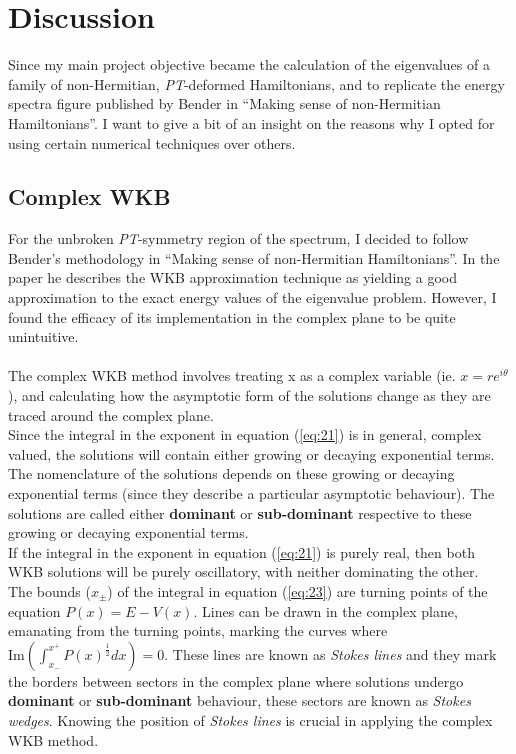 \documentclass[10pt, a4paper, singlespacing, headsepline]{report}
\newcommand\PT{\emph{PT}}
\begin{document}
\chapter{Discussion}\label{Discussion}
Since my main project objective became the calculation of the eigenvalues of a family of non-Hermitian, \PT-deformed Hamiltonians, and to replicate the energy spectra figure published by Bender in ``Making sense of non-Hermitian Hamiltonians''. I want to give a bit of an insight on the reasons why I opted for using certain numerical techniques over others.

\section{Complex WKB}\label{Complex WKB}
For the unbroken \PT-symmetry region of the spectrum, I decided to follow Bender's methodology in ``Making sense of non-Hermitian Hamiltonians''. In the paper he describes the WKB approximation technique as yielding a good approximation to the exact energy values of the eigenvalue problem. However, I found the efficacy of its implementation in the complex plane to be quite unintuitive.\\\\
The complex WKB method involves treating x as a complex variable (ie. $x = re^{i\theta}$), and calculating how the asymptotic form of the solutions change as they are traced around the complex plane\cite{Sorrell}.\\
Since the integral in the exponent in equation (\ref{eq:21}) is in general, complex valued, the solutions will contain either growing or decaying exponential terms. The nomenclature of the solutions depends on these growing or decaying exponential terms (since they describe a particular asymptotic behaviour). The solutions are called either \textbf{dominant} or \textbf{sub-dominant} respective to these growing or decaying exponential terms. \\If the integral in the exponent in equation (\ref{eq:21}) is purely real, then both WKB solutions will be purely oscillatory, with neither dominating the other\cite{Sorrell}.\\
The bounds ($x_{\pm}$) of the integral in equation (\ref{eq:23}) are turning points of the equation $P(x) = E - V(x)$. Lines can be drawn in the complex plane, emanating from the turning points, marking the curves where $\mathrm{Im}(\int_{x_-}^{x^+} P(x)^{\frac{1}{2}}dx) = 0$. These lines are known as \emph{Stokes lines} and they mark the borders between sectors in the complex plane where solutions undergo \textbf{dominant} or \textbf{sub-dominant} behaviour, these sectors are known as \emph{Stokes wedges}. Knowing the position of \emph{Stokes lines} is crucial in applying the complex WKB method\cite{Sorrell}.
\end{document}
